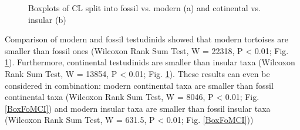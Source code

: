 \begin{center}
	\begin{figure}[htbp]
		\caption{Boxplots of CL split into fossil vs. modern (a) and cotinental vs. insular (b)}
		\label{fig:boxFMCI}
	\end{figure}
\end{center}



Comparison of modern and fossil testudinids showed that modern tortoises are smaller than fossil ones (Wilcoxon Rank Sum Test, W = 22318, P < 0.01; Fig. \ref{fig:boxFMCI}). Furthermore, continental testudinids are smaller than insular taxa (Wilcoxon Rank Sum Test, W = 13854, P < 0.01; Fig. \ref{fig:boxFMCI}).
These results can even be considered in combination: modern continental taxa are smaller than fossil continental taxa (Wilcoxon Rank Sum Test, W = 8046, P < 0.01; Fig. \ref{BoxFoMCI}) and modern insular taxa are smaller than fossil insular taxa (Wilcoxon Rank Sum Test, W = 631.5, P < 0.01; Fig. \ref{BoxFoMCI}))

